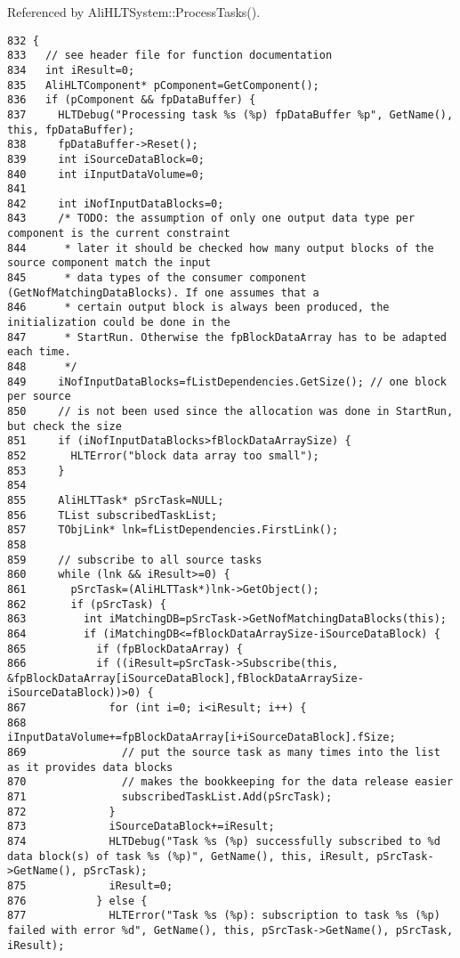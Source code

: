 Referenced by Ali\-HLTSystem::Process\-Tasks().

\footnotesize\begin{verbatim}832 {
833   // see header file for function documentation
834   int iResult=0;
835   AliHLTComponent* pComponent=GetComponent();
836   if (pComponent && fpDataBuffer) {
837     HLTDebug("Processing task %s (%p) fpDataBuffer %p", GetName(), this, fpDataBuffer);
838     fpDataBuffer->Reset();
839     int iSourceDataBlock=0;
840     int iInputDataVolume=0;
841 
842     int iNofInputDataBlocks=0;
843     /* TODO: the assumption of only one output data type per component is the current constraint
844      * later it should be checked how many output blocks of the source component match the input
845      * data types of the consumer component (GetNofMatchingDataBlocks). If one assumes that a
846      * certain output block is always been produced, the initialization could be done in the
847      * StartRun. Otherwise the fpBlockDataArray has to be adapted each time.
848      */
849     iNofInputDataBlocks=fListDependencies.GetSize(); // one block per source
850     // is not been used since the allocation was done in StartRun, but check the size
851     if (iNofInputDataBlocks>fBlockDataArraySize) {
852       HLTError("block data array too small");
853     }
854 
855     AliHLTTask* pSrcTask=NULL;
856     TList subscribedTaskList;
857     TObjLink* lnk=fListDependencies.FirstLink();
858 
859     // subscribe to all source tasks
860     while (lnk && iResult>=0) {
861       pSrcTask=(AliHLTTask*)lnk->GetObject();
862       if (pSrcTask) {
863         int iMatchingDB=pSrcTask->GetNofMatchingDataBlocks(this);
864         if (iMatchingDB<=fBlockDataArraySize-iSourceDataBlock) {
865           if (fpBlockDataArray) {
866           if ((iResult=pSrcTask->Subscribe(this, &fpBlockDataArray[iSourceDataBlock],fBlockDataArraySize-iSourceDataBlock))>0) {
867             for (int i=0; i<iResult; i++) {
868               iInputDataVolume+=fpBlockDataArray[i+iSourceDataBlock].fSize;
869               // put the source task as many times into the list as it provides data blocks
870               // makes the bookkeeping for the data release easier
871               subscribedTaskList.Add(pSrcTask);
872             }
873             iSourceDataBlock+=iResult;
874             HLTDebug("Task %s (%p) successfully subscribed to %d data block(s) of task %s (%p)", GetName(), this, iResult, pSrcTask->GetName(), pSrcTask);
875             iResult=0;
876           } else {
877             HLTError("Task %s (%p): subscription to task %s (%p) failed with error %d", GetName(), this, pSrcTask->GetName(), pSrcTask, iResult);

\end{verbatim}
